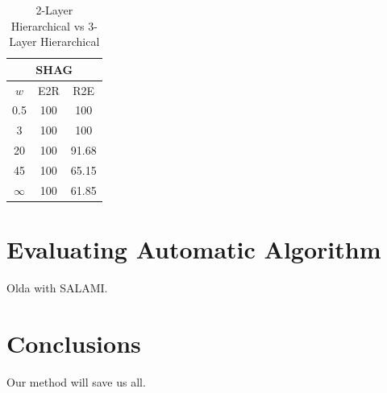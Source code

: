 \documentclass{article}
\begin{document}
\begin{table}
 \begin{center}
   \begin{tabular}{|c|c|c|}
  \hline
  \multicolumn{3}{|c|}{\textbf{SHAG}} \\
  \hline
  $w$       & E2R       & R2E      \\
  \hline
  0.5       & 100       & 100      \\     
  3         & 100       & 100      \\
  20        & 100       & 91.68    \\
  45        & 100       & 65.15    \\
  $\infty$  & 100       & 61.85    \\
  \hline
 \end{tabular}
\end{center}
  \caption{2-Layer Hierarchical vs 3-Layer Hierarchical}
  \label{tab:hier-hiercomp}
\end{table}

\section{Evaluating Automatic Algorithm}

Olda\cite{McFee2014} with SALAMI.




\section{Conclusions}

Our method will save us all.



%
\end{document}
